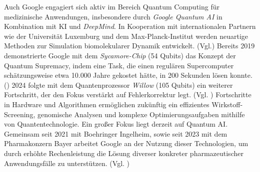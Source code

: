 Auch Google engagiert sich aktiv im Bereich Quantum Computing für medizinische Anwendungen, insbesondere durch \textit{Google Quantum AI} in Kombination mit KI und \textit{DeepMind}. In Kooperation mit internationalen Partnern wie der Universität Luxemburg und dem Max-Planck-Institut werden neuartige Methoden zur Simulation biomolekularer Dynamik entwickelt. (Vgl.\cite{unkeBiomolecularDynamicsMachinelearned2024}) 
Bereits 2019 demonstrierte Google mit dem \textit{Sycamore-Chip} (54 Qubits) das Konzept der Quantum Supremacy, indem eine Task, die einen regulären Supercomputer schätzungsweise etwa 10.000 Jahre gekostet hätte, in 200 Sekunden lösen konnte. (\cite{arute_quantum_2019}) 
2024 folgte mit dem Quantenprozessor \textit{Willow} (105 Qubits) ein weiterer Fortschritt, der den Fokus verstärkt auf Fehlerkorrektur legt. (Vgl. \cite{acharya_quantum_2025}) Fortschritte in Hardware und Algorithmen ermöglichen zukünftig ein effizientes  Wirkstoff-Screening, genomische Analysen und komplexe Optimierungsaufgaben mithilfe von Quantentechnologie. 
Ein großer Fokus liegt derzeit auf Quantum AI. Gemeinsam seit 2021 mit Boehringer Ingelheim, sowie seit 2023 mit dem Pharmakonzern Bayer arbeitet Google an der Nutzung dieser Technologien, um durch erhöhte Rechenleistung die Lösung diverser konkreter pharmazeutischer Anwendungsfälle zu unterstützen. (Vgl. \cite{ingelheimCooperationGoogleQuantum2021, BayerAccelerateDrug})\\

